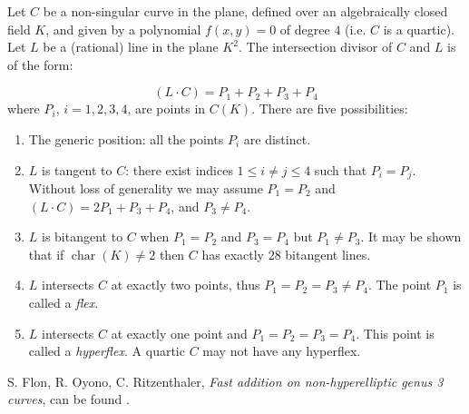 \documentclass[12pt]{article}
\theoremstyle{definition}
\begin{document}
Let $C$ be a non-singular curve in the plane, defined over an algebraically closed field $K$, and given by a polynomial $f(x,y)=0$ of degree $4$ (i.e. $C$ is a quartic). Let $L$ be a (rational) line in the plane $K^2$. The intersection divisor of $C$ and $L$ is of the form:

$$(L\cdot C)=P_1+P_2+P_3+P_4$$
where $P_i$, $i=1,2,3,4$, are points in $C(K)$. There are five possibilities:

\begin{enumerate}
\item The generic position: all the points $P_i$ are distinct.

\item $L$ is tangent to $C$: there exist indices $1\leq i\neq j\leq 4$ such that $P_i=P_j$. Without loss of generality we may assume $P_1=P_2$ and $(L\cdot C)=2P_1 + P_3+P_4$, and $P_3\neq P_4$.

\item $L$ is bitangent to $C$ when $P_1=P_2$ and $P_3=P_4$ but $P_1\neq P_3$. It may be shown that if $\operatorname{char}(K)\neq 2$ then $C$ has exactly $28$ bitangent lines.

\item $L$ intersects $C$ at exactly two points, thus $P_1=P_2=P_3\neq P_4$. The point $P_1$ is called a {\it flex}.

\item $L$ intersects $C$ at exactly one point and $P_1=P_2=P_3=P_4$. This point is called a {\it hyperflex}. A quartic $C$ may not have any hyperflex.

\end{enumerate}

\begin{thebibliography}{00}
 S. Flon, R. Oyono, C. Ritzenthaler, {\em Fast addition on non-hyperelliptic genus 3 curves}, can be found .
\end{thebibliography}
\end{document}
